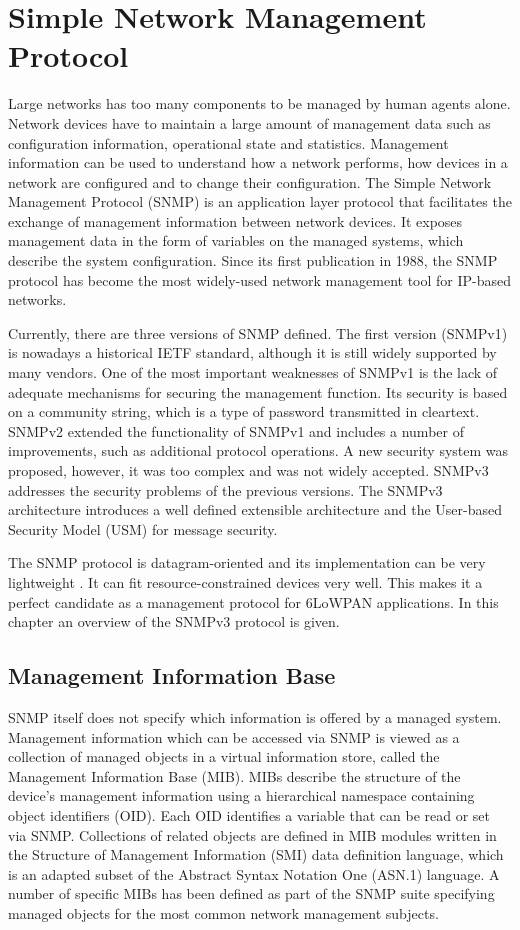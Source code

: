 \chapter{Simple Network Management Protocol}\label{ch:snmp}
Large networks has too many components to be managed by human agents alone. Network devices have to maintain a large amount of management data such as configuration information,  operational state and statistics. Management information can be used to understand how a network performs, how devices in a network are configured and to change their configuration. The Simple Network Management Protocol (SNMP) \cite{rfc3410} is an application layer protocol that facilitates the exchange of management information between network devices. It exposes management data in the form of variables on the managed systems, which describe the system configuration. Since its first publication in 1988, the SNMP protocol has become the most widely-used network management tool for IP-based networks.

Currently, there are three versions of SNMP defined. The first version (SNMPv1) is nowadays a historical IETF standard, although it is still widely supported by many vendors. One of the most important weaknesses of SNMPv1 is the lack of adequate mechanisms for securing the management function. Its security is based on a community string, which is a type of password transmitted in cleartext. SNMPv2 extended the functionality of SNMPv1 and includes a number of improvements, such as additional protocol operations. A new security system was proposed, however, it was too complex and was not widely accepted. SNMPv3 addresses the security problems of the previous versions. The SNMPv3 architecture introduces a well defined extensible architecture and the User-based Security Model (USM) for message security.

The SNMP protocol is datagram-oriented and its implementation can be very lightweight \cite{draft-6lowpan-snmp}. It can fit resource-constrained devices very well. This makes it a perfect candidate as a management protocol for 6LoWPAN applications. In this chapter an overview of the SNMPv3 protocol is given.

\section{Management Information Base}
SNMP itself does not specify which information is offered by a managed system. Management information which can be accessed via SNMP is viewed as a collection of managed objects in a virtual information store, called the Management Information Base (MIB). MIBs describe the structure of the device's management information using a hierarchical namespace containing object identifiers (OID). Each OID identifies a variable that can be read or set via SNMP. Collections of related objects are defined in MIB modules written in the Structure of Management Information (SMI) data definition language, which is an adapted subset of the Abstract Syntax Notation One (ASN.1) language. A number of specific MIBs has been defined as part of the SNMP suite specifying managed objects for the most common network management subjects.

